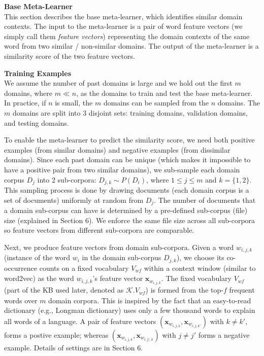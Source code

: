 \textbf{Base Meta-Learner}\\
This section describes the base meta-learner, which identifies similar domain contexts. The input to the meta-learner is a pair of word feature vectors (we simply call them \emph{feature vectors}) representing the domain contexts of the same word from two similar / non-similar domains.
The output of the meta-learner is a similarity score of the two feature vectors.

\textbf{Training Examples}\\
We assume the number of past domains is large and we hold out the first $m$ domains, where $m \ll n$, as the domains to train and test the base meta-learner.
In practice, if $n$ is small, the $m$ domains can be sampled from the $n$ domains.
The $m$ domains are split into 3 disjoint sets: training domains, validation domains, and testing domains.

To enable the meta-learner to predict the similarity score, we need both positive examples (from similar domains) and negative examples (from dissimilar domains).
Since each past domain can be unique (which makes it impossible to have a positive pair from two similar domains), we sub-sample each domain corpus $D_j$ into 2 sub-corpora: $D_{j, k} \sim P(D_i)$, where $1\le j\le m$ and $k=\{1, 2\}$.
This sampling process is done by drawing documents (each domain corpus is a set of documents) uniformly at random from $D_j$.
The number of documents that a domain sub-corpus can have is determined by a pre-defined sub-corpus (file) size (explained in Section 6).
We enforce the same file size across all sub-corpora so feature vectors from different sub-corpora are comparable.

Next, we produce feature vectors from domain sub-corpora.
Given a word $w_{i, j, k}$ (instance of the word $w_{i}$ in the domain sub-corpus $D_{j, k}$), we choose its co-occurrence counts on a fixed vocabulary $V_{\textit{wf}}$ within a context window (similar to word2vec) as the word $w_{i, j, k}$'s feature vector $\mathbf{x}_{w_{i, j, k}}$.
The fixed vocabulary $V_{\textit{wf}}$ (part of the KB used later, denoted as $\mathcal{K}.V_{\textit{wf}}$) is formed from the top-$f$ frequent words over $m$ domain corpora.
This is inspired by the fact that an easy-to-read dictionary (e.g., Longman dictionary) uses only a few thousand words to explain all words of a language.
A pair of feature vectors $(\mathbf{x}_{w_{i, j, k}}, \mathbf{x}_{w_{i, j, k'}})$ with $k \neq k'$, forms a postive example; 
whereas $(\mathbf{x}_{w_{i, j, k}}, \mathbf{x}_{w_{i, j', k}})$ with $j\neq j'$ forms a negative example.
Details of settings are in Section 6.

